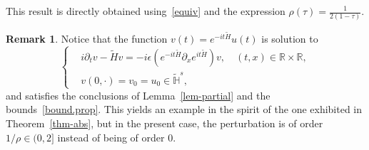 \documentclass[10pt]{amsart}
\theoremstyle{definition}\newtheorem{defi}[theo]{Definition}\newtheorem{rema}[theo]{Remark}\newtheorem{exam}[theo]{Example}\newtheorem{exem}[theo]{Example}\newtheorem{nota}[theo]{Notation}
\newcommand{\R}{\mathbb{R}}
\newcommand{\HH}{\mathbb{H}}
\newcommand*\eps{\epsilon}
\newcommand{\wt}{\widetilde}
\newcommand{\<}{\langle}
\renewcommand{\>}{\rangle}
\begin{document}
This result is directly obtained using~\eqref{equiv} and the expression $\rho(\tau)=\frac1{2(1-\tau)}$.

\begin{rema}\label{remchgt}
Notice that the function $v(t)=e^{-it \wt{H}}u(t)$ is solution to
\[
\begin{cases}
&i\partial_t v-\wt{H}v=-i \eps \left(e^{-it \wt{H}} \partial_x e^{it \wt{H}}\right)v, \quad (t,x)\in \R\times \R,\\
&v(0, \cdot)= v_0=u_0 \in \widetilde{\HH}^{s},
\end{cases}
\]
and satisfies the conclusions of Lemma~\ref{lem-partial} and the bounds~\eqref{bound.prop}. This yields an example in the spirit of the one exhibited in Theorem~\ref{thm-abs}, but in the present case, the perturbation is of order~$1/\rho \in (0,2]$ instead of being of order 0.
\end{rema}
\end{document}

